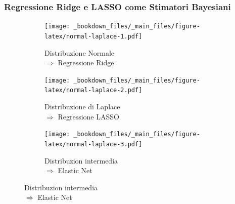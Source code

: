 \documentclass[pdf, aspectratio=169, xcolor=dvipsnames]{beamer}\usepackage[]{graphicx}\usepackage[]{color}
\theoremstyle{definition}
\begin{document}
\begin{frame}
\frametitle{Regressione Ridge e LASSO come Stimatori Bayesiani}

\fontsize{9pt}{11pt}\selectfont

\begin{figure}
  \centering
  \begin{subfigure}[b]{5cm}
    \captionsetup{justification=raggedright}
    \centering
    \caption{\hspace{0.9cm} Distribuzione Normale \\ \hspace{0.9cm} $\Rightarrow$ Regressione Ridge}
    \texttt{[image: \_bookdown\_files/\_main\_files/figure-latex/normal-laplace-1.pdf]}
  \end{subfigure}
  \qquad
  \begin{subfigure}[b]{5cm}
    \captionsetup{justification=raggedright}
    \centering
    \caption{\hspace{0.9cm} Distribuzione di Laplace \\ \hspace{0.9cm} $\Rightarrow$ Regressione LASSO}
    \texttt{[image: \_bookdown\_files/\_main\_files/figure-latex/normal-laplace-2.pdf]}
  \end{subfigure}
  \begin{subfigure}[b]{5cm}
    \captionsetup{justification=raggedright}
    \centering
    \caption{\hspace{0.9cm} Distribuzion intermedia \\ \hspace{0.9cm} $\Rightarrow$ Elastic Net}
    \texttt{[image: \_bookdown\_files/\_main\_files/figure-latex/normal-laplace-3.pdf]}
  \end{subfigure}
\end{figure}

\end{frame}
\end{document}
